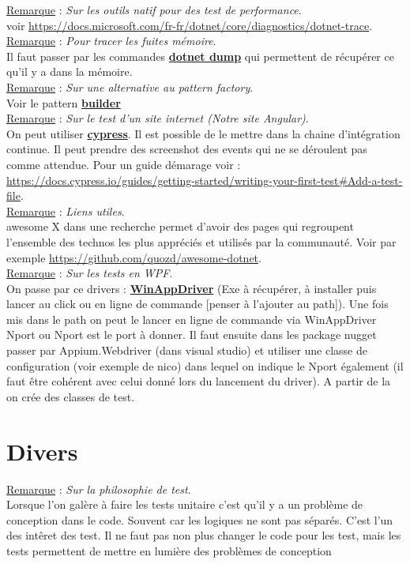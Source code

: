 \documentclass[a4paper,12pt,twoside]{article}
\newcommand{\urlcolor}{magenta}  %
\newcommand{\keycolor}{purple} %
\newcommand{\rem}[2]{\noindent\underline{Remarque} : \textit{#1}.\\ \indent #2}
\newcommand{\keyref}[2]{\hypersetup{urlcolor=\keycolor} \href{#1}{\textbf{#2}}\hypersetup{urlcolor=\urlcolor}}
\begin{document}
\rem{Sur les outils natif pour des test de performance}{voir \url{https://docs.microsoft.com/fr-fr/dotnet/core/diagnostics/dotnet-trace}.}\\

\rem{Pour tracer les fuites mémoire}{Il faut passer par les commandes \keyref{https://docs.microsoft.com/fr-fr/dotnet/core/diagnostics/dotnet-dump}{dotnet dump} qui permettent de récupérer ce qu'il y a dans la mémoire.}\\

\rem{Sur une alternative au pattern factory}{Voir le pattern \keyref{https://refactoring.guru/design-patterns/builder}{builder}}\\

\rem{Sur le test d'un site internet (Notre site Angular)}{On peut utiliser \keyref{https://github.com/cypress-io/cypress}{cypress}. Il est possible de le mettre dans la chaine d'intégration continue. Il peut prendre des screenshot des events qui ne se déroulent pas comme attendue. Pour un guide démarage voir : \url{https://docs.cypress.io/guides/getting-started/writing-your-first-test\#Add-a-test-file}.}\\

\rem{Liens utiles}{awesome X dans une recherche permet d'avoir des pages qui regroupent l'ensemble des technos les plus appréciés et utilisés par la communauté. Voir par exemple \url{https://github.com/quozd/awesome-dotnet}.}\\

\rem{Sur les tests en WPF}{On passe par ce drivers : \keyref{https://github.com/microsoft/WinAppDriver}{WinAppDriver} (Exe à récupérer, à installer puis lancer au click ou en ligne de commande [penser à l'ajouter au path]). Une fois mis dans le path on peut le lancer en ligne de commande via WinAppDriver Nport ou Nport est le port à donner. Il faut ensuite dans les package nugget passer par Appium.Webdriver (dans visual studio) et utiliser une classe de configuration (voir exemple de nico) dans lequel on indique le Nport également (il faut être cohérent avec celui donné lors du lancement du driver). A partir de la on crée des classes de test.}\\

\section{Divers}

\rem{Sur la philosophie de test}{Lorsque l'on galère à faire les tests unitaire c'est qu'il y a un problème de conception dans le code. Souvent car les logiques ne sont pas séparés. C'est l'un des intêret des test. Il ne faut pas non plus changer le code pour les test, mais les tests permettent de mettre en lumière des problèmes de conception}\\
\end{document}
